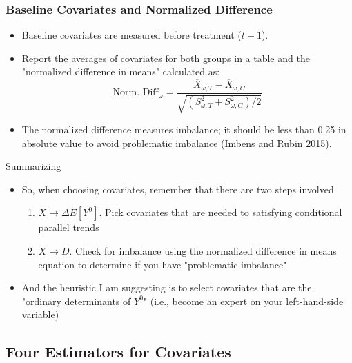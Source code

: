 \documentclass{beamer}
\begin{document}
\begin{frame}
    \frametitle{Baseline Covariates and Normalized Difference}
    \begin{itemize}
        \item Baseline covariates are measured before treatment ($t-1$). 
        \item Report the averages of covariates for both groups in a table and the "normalized difference in means" calculated as:
        $$ \text{Norm. Diff}_\omega = \frac{\overline{X}_{\omega,T} - \overline{X}_{\omega,C}}{\sqrt{(S_{\omega,T}^2 + S_{\omega,C}^2)/2}} $$
        \item The normalized difference measures imbalance; it should be less than 0.25 in absolute value to avoid problematic imbalance (Imbens and Rubin 2015).
    \end{itemize}
\end{frame}


\begin{frame}{Summarizing}
    \begin{itemize}
    \item So, when choosing covariates, remember that there are two steps involved
    	\begin{enumerate}
	\item $X \rightarrow \Delta E[Y^0]$. Pick covariates that are needed to satisfying conditional parallel trends 
	\item $X \rightarrow D$. Check for imbalance using the normalized difference in means equation to determine if you have "problematic imbalance"
	\end{enumerate}
\item And the heuristic I am suggesting is to select covariates that are the "ordinary determinants of $Y^0$" (i.e., become an expert on your left-hand-side variable)
    \end{itemize}
\end{frame}

 






\subsection{Four Estimators for Covariates}
\end{document}
